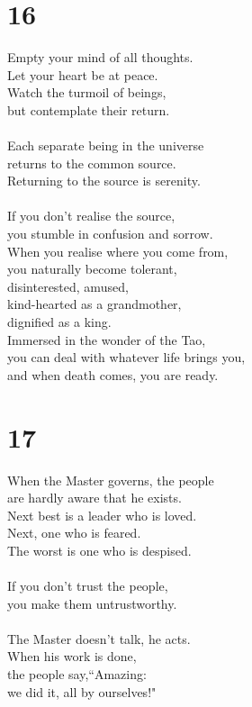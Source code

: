 \documentclass[b5paper, 12pt, oneside]{book}
\begin{document}
\chapter*{16}
Empty your mind of all thoughts.\\
Let your heart be at peace.\\
Watch the turmoil of beings,\\
but contemplate their return.\\
\\
Each separate being in the universe\\
returns to the common source.\\
Returning to the source is serenity.\\
\\
If you don't realise the source,\\
you stumble in confusion and sorrow.\\
When you realise where you come from,\\
you naturally become tolerant,\\
disinterested, amused,\\
kind-hearted as a grandmother,\\
dignified as a king.\\
Immersed in the wonder of the Tao,\\
you can deal with whatever life brings you,\\
and when death comes, you are ready.\\

\chapter*{17}
When the Master governs, the people\\
are hardly aware that he exists.\\
Next best is a leader who is loved.\\
Next, one who is feared.\\
The worst is one who is despised.\\
\\
If you don't trust the people,\\
you make them untrustworthy.\\
\\
The Master doesn't talk, he acts.\\
When his work is done,\\
the people say,``Amazing:\\
we did it, all by ourselves!"\\
\end{document}
